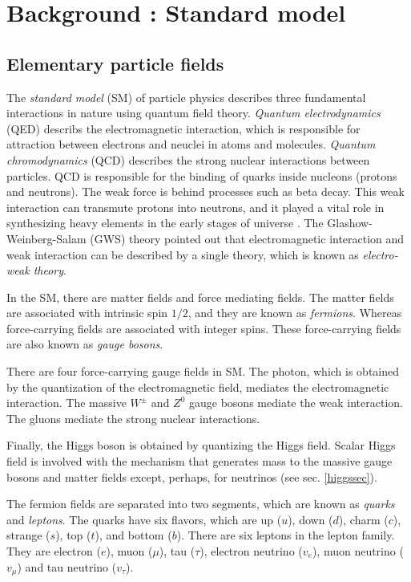 \chapter{Background : Standard model}

\section{Elementary particle fields}
%
The \textit{standard model} (SM) of particle physics describes three fundamental interactions in nature using quantum field theory. \textit{Quantum electrodynamics} (QED) describs the electromagnetic interaction, which is responsible for attraction between electrons and neuclei in atoms and molecules. \textit{Quantum chromodynamics } (QCD) describes the strong nuclear interactions between particles. QCD is responsible for the binding of quarks inside nucleons (protons and neutrons). The weak force is behind processes such as beta decay. This weak interaction can transmute protons into neutrons, and it played a vital role in synthesizing heavy elements in the early stages of universe \cite{Barger:1987nn}. The Glashow-Weinberg-Salam (GWS) theory \cite{Glashow:1961tr, Weinberg:1967tq} pointed out that electromagnetic interaction and weak interaction can be described by a single theory, which is known as \textit{electro-weak theory}.\par
In the SM, there are matter fields and force mediating fields. The matter fields are associated with intrinsic spin $1/2$, and they are known as \textit{fermions}. Whereas force-carrying fields are associated with integer spins. These force-carrying fields are also known as \textit{gauge bosons}. \par
There are four force-carrying gauge fields in SM. The photon, which is obtained by the quantization of the electromagnetic field, mediates the electromagnetic interaction. The massive $W^{\pm}$ and $Z^{0}$ gauge bosons mediate the weak interaction. The gluons mediate the strong nuclear interactions.\par
Finally, the Higgs boson is obtained by quantizing the Higgs field.
Scalar Higgs field is involved with the mechanism that generates mass to the massive gauge bosons and matter fields except, perhaps, for neutrinos (see sec. \ref{higgssec}).\par
The fermion fields are separated into two segments, which are known as \textit{quarks} and \textit{leptons}. The quarks have six flavors, which are up ($u$), down ($d$), charm ($c$), strange ($s$), top ($t$), and bottom ($b$). There are six leptons in the lepton family. They are electron ($e$), muon ($\mu$), tau ($\tau$), electron neutrino ($v_{e}$), muon neutrino ($v_{\mu}$) and tau neutrino ($v_{\tau}$).\par
